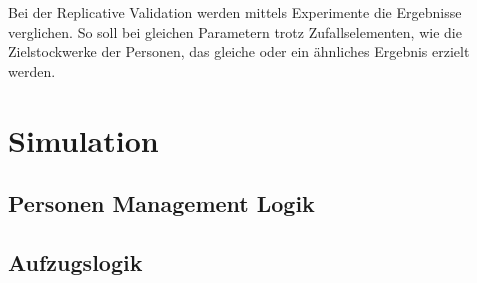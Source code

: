 \documentclass[envcountsame, envcountchap, deutsch]{i-studis}
\begin{document}
Bei der Replicative Validation werden mittels Experimente die Ergebnisse
verglichen. So soll bei gleichen Parametern trotz Zufallselementen, wie
die Zielstockwerke der Personen, das gleiche oder ein ähnliches Ergebnis
erzielt werden.

\hypertarget{simulation}{%
\chapter{Simulation}\label{simulation}}

\hypertarget{personen-management-logik}{%
\section{Personen Management Logik}\label{personen-management-logik}}

\hypertarget{aufzugslogik}{%
\section{Aufzugslogik}\label{aufzugslogik}}




\end{document}

